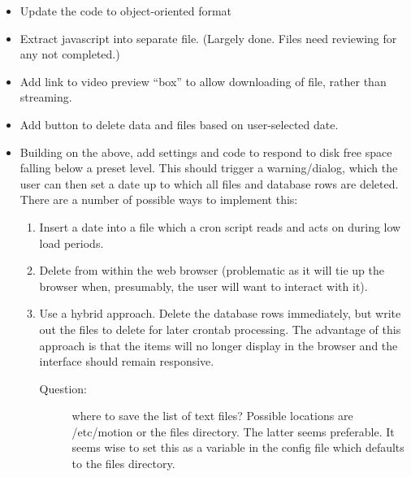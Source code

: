 \documentclass[12pt]{scrartcl} %
\begin{document}
	\begin{itemize}
		\item Update the code to object-oriented format

		\item Extract javascript into separate file. (Largely done. Files need reviewing for any not completed.)

		\item Add link to video preview \enquote{box} to allow downloading of file, rather
		than streaming.

		\item Add button to delete data and files based on user-selected date.

		\item Building on the above, add settings and code to respond to disk free space falling below a preset level.
		This should trigger a warning/dialog, which the user can then set a date up to which
		all files and database rows are deleted. There are a number of possible ways to implement this:
		\begin{enumerate}
			\item Insert a date into a file which a cron script reads
			and acts on during low load periods.
			\item Delete from within the web browser
			(problematic as it will tie up the browser when, presumably,
			the user will want to interact with it).
			\item Use a hybrid approach. Delete the database rows immediately, but write out the files to delete for later crontab processing. The advantage of this approach is that the items will no longer display in the browser and the interface should remain responsive.
			\begin{description}
				\item [Question:] where to save the list of text files? Possible locations are /etc/motion or the files directory. The latter seems preferable. It seems wise to set this as a variable in the config file which defaults to the files directory.
			\end{description}
		\end{enumerate}

	\end{itemize}
\end{document}
